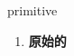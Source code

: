 
\begin{frame}
{\huge primitive}
\begin{center}
\begin{enumerate}\Large
  \item \textbf{原始的}
\end{enumerate}
\end{center}
\end{frame}
